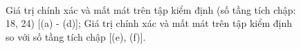 \begin{figure}[ht!]
\begin{center}
{        }\\
%
    \end{center}
    \caption{%
        Giá trị chính xác và mất mát trên tập kiểm định (số tầng tích chập: 18, 24) [(a) - (d)]; Giá trị chính xác và mất mát trên tập kiểm định so với số tầng tích chập [(e), (f)].
     }%
  \label{fig:mnistcnn2}
\end{figure}

\clearpage